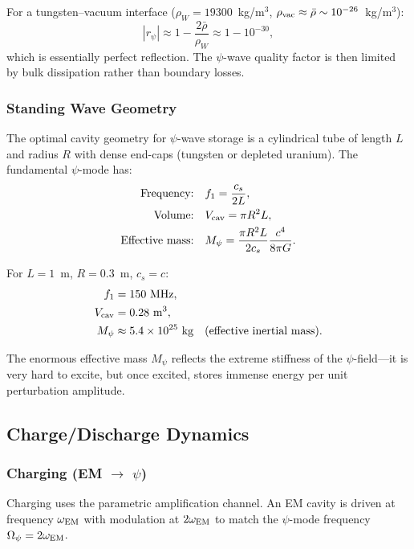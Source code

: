 \documentclass[aps,prd,twocolumn,showpacs,preprintnumbers,superscriptaddress,nofootinbib]{revtex4-2}
\begin{document}
For a tungsten--vacuum interface ($\rho_W = 19300$~kg/m$^3$,
$\rho_{\rm vac}\approx\bar{\rho}\sim 10^{-26}$~kg/m$^3$):
\begin{equation}
|r_\psi| \approx 1 - \frac{2\bar{\rho}}{\rho_W} \approx 1 - 10^{-30},
\end{equation}
which is essentially perfect reflection.  The $\psi$-wave quality factor
is then limited by bulk dissipation rather than boundary losses.

\subsubsection{Standing Wave Geometry}

The optimal cavity geometry for $\psi$-wave storage is a cylindrical
tube of length $L$ and radius $R$ with dense end-caps (tungsten or
depleted uranium).  The fundamental $\psi$-mode has:
\begin{align}
\text{Frequency:}\quad & f_1 = \frac{c_s}{2L}, \\
\text{Volume:}\quad & V_{\rm cav} = \pi R^2 L, \\
\text{Effective mass:}\quad & M_\psi = \frac{\pi R^2 L}{2c_s}\frac{c^4}{8\pi G}.
\end{align}

For $L = 1$~m, $R = 0.3$~m, $c_s = c$:
\begin{align}
f_1 &= 150~\text{MHz}, \\
V_{\rm cav} &= 0.28~\text{m}^3, \\
M_\psi &\approx 5.4\times 10^{25}~\text{kg} \quad (\text{effective inertial mass}).
\end{align}

The enormous effective mass $M_\psi$ reflects the extreme stiffness of
the $\psi$-field---it is very hard to excite, but once excited, stores
immense energy per unit perturbation amplitude.

\subsection{Charge/Discharge Dynamics}\label{sec:charge-discharge}

\subsubsection{Charging (EM $\to$ $\psi$)}

Charging uses the parametric amplification channel.  An EM cavity is
driven at frequency $\omega_{\rm EM}$ with modulation at $2\omega_{\rm EM}$
to match the $\psi$-mode frequency $\Omega_\psi = 2\omega_{\rm EM}$.
\end{document}
